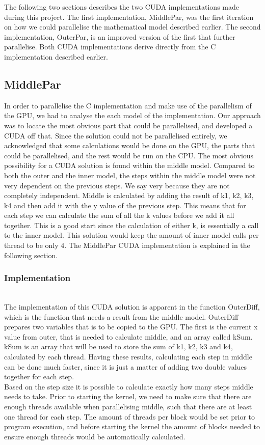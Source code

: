 The following two sections describes the two CUDA implementations made during this project. The first implementation, MiddlePar, was the first iteration on how we could parallelise the mathematical model described earlier. The second implementation, OuterPar, is an improved version of the first that further parallelise. Both CUDA implementations derive directly from the C implementation described earlier.

\subsection{MiddlePar}
In order to parallelise the C implementation and make use of the parallelism of the GPU, we had to analyse the each model of the implementation. Our approach was to locate the most obvious part that could be parallelised, and developed a CUDA off that. Since the solution could not be parallelised entirely, we acknowledged that some calculations would be done on the GPU, the parts that could be parallelised, and the rest would be run on the CPU. The most obvious possibility for a CUDA solution is found within the middle model. Compared to both the outer and the inner model, the steps within the middle model were not very dependent on the previous steps. We say very because they are not completely independent. Middle is calculated by adding the result of k1, k2, k3, k4 and then add it with the y value of the previous step. This means that for each step we can calculate the sum of all the k values before we add it all together. This is a good start since the calculation of either k, is essentially a call to the inner model. This solution would keep the amount of inner model calls per thread to be only 4. The MiddlePar CUDA implementation is explained in the following section.

\subsubsection{Implementation} \hfill\\
The implementation of this CUDA solution is apparent in the function OuterDiff, which is the function that needs a result from the middle model. OuterDiff prepares two variables that is to be copied to the GPU. The first is the current x value from outer, that is needed to calculate middle, and an array called kSum. kSum is an array that will be used to store the sum of k1, k2, k3 and k4, calculated by each thread. Having these results, calculating each step in middle can be done much faster, since it is just a matter of adding two double values together for each step. \\
Based on the step size it is possible to calculate exactly how many steps middle needs to take. Prior to starting the kernel, we need to make sure that there are enough threads available when parallelising middle, such that there are at least one thread for each step. The amount of threads per block would be set prior to program execution, and before starting the kernel the amount of blocks needed to ensure enough threads would be automatically calculated.\\

